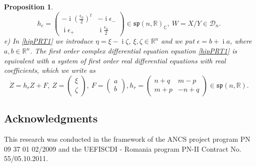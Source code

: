 \documentclass[12pt]{amsart}
\numberwithin{equation}{section}
\newtheorem{Proposition}{Proposition}
\theoremstyle{definition}
\begin{document}
\begin{Proposition}
\begin{equation}
h_c=\left(\begin{array}{cc} -{\operatorname{i}}(\frac{\epsilon_0}{2})^t &
    -{\operatorname{i}}\epsilon_-\\ {\operatorname{i}}\epsilon_+& 
{\operatorname{i}}\frac{\epsilon_0}{2}\end{array}\right)\in {{\mathfrak{{sp}}}}(n,{\ensuremath{\mathbb{R}}})_{\ensuremath{\mathbb{C}}} , ~W=X/Y\in{{\mathcal{{D}}}}_n. 
\end{equation}
e) In \eqref{hipPRT1} we
introduce $\eta=\xi - {\operatorname{i}} \zeta$, $\xi,\zeta\in{\ensuremath{\mathbb{R}}}^n$ and  we put 
$\epsilon= b+{\operatorname{i}} a$, where $a,b\in{\ensuremath{\mathbb{R}}}^n$.  The first order complex differential equation equation
\eqref{hipPRT1} is equivalent with a system of first order real 
differential equations with real coefficients, which we write as  
\begin{equation}\label{LINe} \dot{Z}=h_rZ + F, ~ Z = 
\left( \begin{array}{c}{\xi} \\
    {\zeta}\end{array}\right), ~ 
 F = \left(\begin{array}{c}a \\ b \end{array}\right),
h_r\!=\! \left(\begin{array}{cc} \!n+q
    & m-p\\  m+ p  & -n+q \!\end{array}\!\right)\! \in{{\mathfrak{{sp}}}}(n,{\ensuremath{\mathbb{R}}}).
\end{equation}
\end{Proposition}
\vspace{3ex}

\subsection*{Acknowledgments}
This research  was conducted in  the  framework of the 
ANCS project  program PN 09 37 01 02/2009  and     the UEFISCDI - Romania 
 program PN-II Contract No. 55/05.10.2011. 
\end{document}
